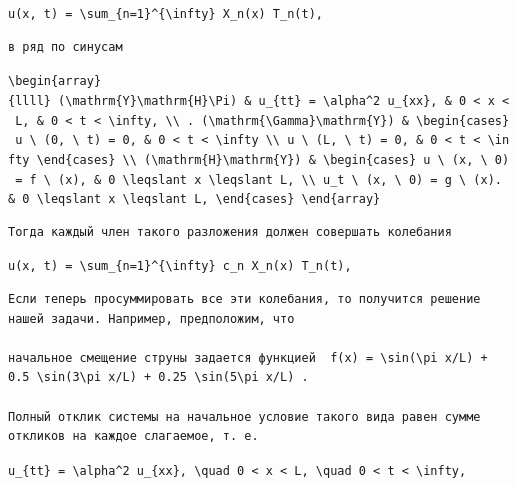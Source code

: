 \documentclass[
  ukrainian,
]{article}
\begin{document}
\texttt{u(x,\ t)\ =\ \textbackslash{}sum\_\{n=1\}\^{}\{\textbackslash{}infty\}\ X\_n(x)\ T\_n(t),}

\begin{verbatim}
в ряд по синусам
\end{verbatim}

\texttt{\textbackslash{}begin\{array\}\{llll\}\ (\textbackslash{}mathrm\{Y\}\textbackslash{}mathrm\{H\}\textbackslash{}Pi)\ \&\ u\_\{tt\}\ =\ \textbackslash{}alpha\^{}2\ u\_\{xx\},\ \&\ 0\ \textless{}\ x\ \textless{}\ L,\ \&\ 0\ \textless{}\ t\ \textless{}\ \textbackslash{}infty,\ \textbackslash{}\textbackslash{}\ .\ (\textbackslash{}mathrm\{\textbackslash{}Gamma\}\textbackslash{}mathrm\{Y\})\ \&\ \textbackslash{}begin\{cases\}\ u\ \textbackslash{}\ (0,\ \textbackslash{}\ t)\ =\ 0,\ \&\ 0\ \textless{}\ t\ \textless{}\ \textbackslash{}infty\ \textbackslash{}\textbackslash{}\ u\ \textbackslash{}\ (L,\ \textbackslash{}\ t)\ =\ 0,\ \&\ 0\ \textless{}\ t\ \textless{}\ \textbackslash{}infty\ \textbackslash{}end\{cases\}\ \textbackslash{}\textbackslash{}\ (\textbackslash{}mathrm\{H\}\textbackslash{}mathrm\{Y\})\ \&\ \textbackslash{}begin\{cases\}\ u\ \textbackslash{}\ (x,\ \textbackslash{}\ 0)\ =\ f\ \textbackslash{}\ (x),\ \&\ 0\ \textbackslash{}leqslant\ x\ \textbackslash{}leqslant\ L,\ \textbackslash{}\textbackslash{}\ u\_t\ \textbackslash{}\ (x,\ \textbackslash{}\ 0)\ =\ g\ \textbackslash{}\ (x).\ \&\ 0\ \textbackslash{}leqslant\ x\ \textbackslash{}leqslant\ L,\ \textbackslash{}end\{cases\}\ \textbackslash{}end\{array\}}

\begin{verbatim}
Тогда каждый член такого разложения должен совершать колебания
\end{verbatim}

\texttt{u(x,\ t)\ =\ \textbackslash{}sum\_\{n=1\}\^{}\{\textbackslash{}infty\}\ c\_n\ X\_n(x)\ T\_n(t),}

\begin{verbatim}
Если теперь просуммировать все эти колебания, то получится решение нашей задачи. Например, предположим, что

начальное смещение струны задается функцией  f(x) = \sin(\pi x/L) + 0.5 \sin(3\pi x/L) + 0.25 \sin(5\pi x/L) .

Полный отклик системы на начальное условие такого вида равен сумме откликов на каждое слагаемое, т. е.
\end{verbatim}

\texttt{u\_\{tt\}\ =\ \textbackslash{}alpha\^{}2\ u\_\{xx\},\ \textbackslash{}quad\ 0\ \textless{}\ x\ \textless{}\ L,\ \textbackslash{}quad\ 0\ \textless{}\ t\ \textless{}\ \textbackslash{}infty,}
\end{document}
